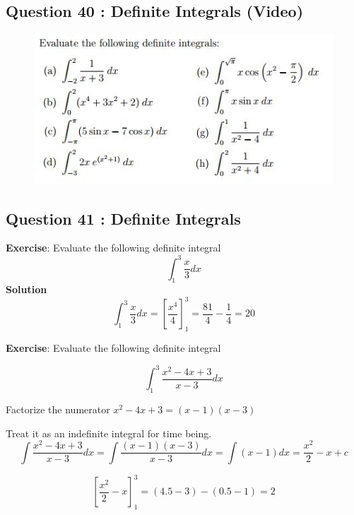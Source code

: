 \documentclass[]{article}
\begin{document}
\subsection*{Question 40 : Definite Integrals (Video)}
\begin{figure}[h!]
	\centering
	\includegraphics[width=0.8\linewidth]{Question25}
\end{figure}
\newpage


\subsection*{Question 41 : Definite Integrals}
\begin{framed}
	{\large
		\noindent \textbf{Exercise}: Evaluate the following definite integral
		\[ \int^{3}_{1} \frac{x}{3}  dx \]
		\textbf{Solution}
		\[ \int^{3}_{1} \frac{x}{3}  dx  = \left[\frac{x^4}{4}\right]^{3}_{1}= \frac{81}{4} - \frac{1}{4} = 20\]
	}
\end{framed}
\newpage
\begin{framed}
	{\large
		\noindent \textbf{Exercise}: Evaluate the following definite integral
		
		\[ \int^3_1 \frac{x^2 - 4x + 3}{x-3}  dx \] 
		
		\noindent	Factorize the numerator $x^2 - 4x + 3 = (x-1)(x-3)$
		
		
		Treat it as an indefinite integral for time being.			
		\[ \int \frac{x^2 - 4x + 3}{x-3}  dx = \int \frac{(x-1)(x-3)}{x-3}  dx  = \int (x-1) dx = \frac{x^2}{2} -x +c\] 
		
		\[ \left[ \frac{x^2}{2} -x\right]^{3}_{1} = (4.5-3)-(0.5-1) = 2\]
	}
\end{framed}
\end{document}
